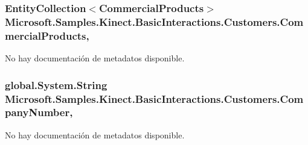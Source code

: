 \hypertarget{class_microsoft_1_1_samples_1_1_kinect_1_1_basic_interactions_1_1_customers_a060cdcb922b96692f13bb172da63d40e}{
\subsubsection[{Commercial\-Products}]{\setlength{\rightskip}{0pt plus 5cm}Entity\-Collection$<${\bf Commercial\-Products}$>$ Microsoft.\-Samples.\-Kinect.\-Basic\-Interactions.\-Customers.\-Commercial\-Products\hspace{0.3cm}{\ttfamily [get]}, {\ttfamily [set]}}}\label{class_microsoft_1_1_samples_1_1_kinect_1_1_basic_interactions_1_1_customers_a060cdcb922b96692f13bb172da63d40e}


No hay documentación de metadatos disponible. 

\hypertarget{class_microsoft_1_1_samples_1_1_kinect_1_1_basic_interactions_1_1_customers_a675808be08341e22652d79058fede1ef}{
\subsubsection[{Company\-Number}]{\setlength{\rightskip}{0pt plus 5cm}global.\-System.\-String Microsoft.\-Samples.\-Kinect.\-Basic\-Interactions.\-Customers.\-Company\-Number\hspace{0.3cm}{\ttfamily [get]}, {\ttfamily [set]}}}\label{class_microsoft_1_1_samples_1_1_kinect_1_1_basic_interactions_1_1_customers_a675808be08341e22652d79058fede1ef}


No hay documentación de metadatos disponible. 


